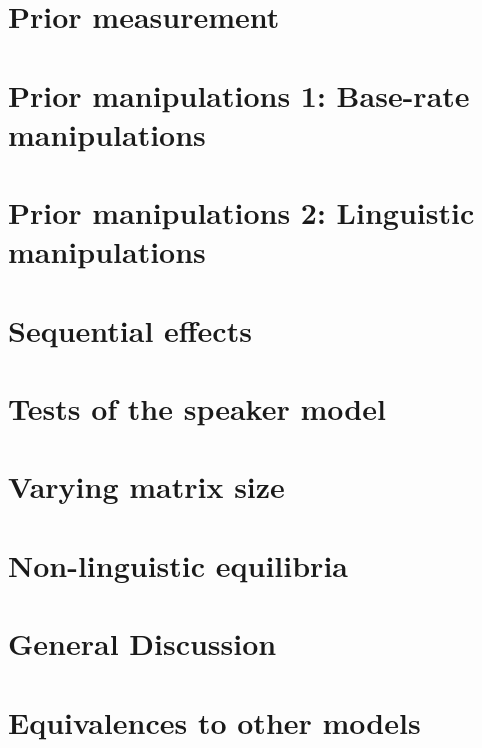 \documentclass[man,noapacite]{apa2}
\begin{document}
\section{Prior measurement}

\section{Prior manipulations 1: Base-rate manipulations}




\section{Prior manipulations 2: Linguistic manipulations}

\section{Sequential effects}

\section{Tests of the speaker model}

\section{Varying matrix size}

\section{Non-linguistic equilibria}



\section{General Discussion}


\newpage




\theappendix

\section{Equivalences to other models}

\end{document}
